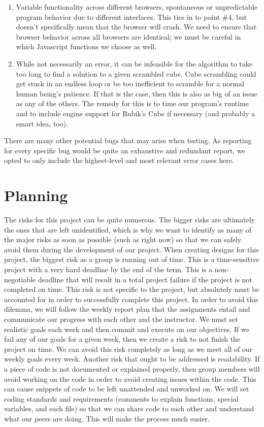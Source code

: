 \documentclass[12pt]{article}
\begin{document}
\begin{enumerate}
\item Variable functionality across different browsers, spontaneous or unpredictable program behavior due to different interfaces. This ties in to point \#4, but doesn’t specifically mean that the browser will crash. We need to ensure that browser behavior across all browsers are identical; we must be careful in which Javascript functions we choose as well.
\item While not necessarily an error, it can be infeasible for the algorithm to take too long to find a solution to a given scrambled cube. Cube scrambling could get stuck in an endless loop or be too inefficient to scramble for a normal human being’s patience. If that is the case, then this is also as big of an issue as any of the others. The remedy for this is to time our program’s runtime and to include engine support for Rubik’s Cube if necessary (and probably a smart idea, too).
\end{enumerate}
\par
There are many other potential bugs that may arise when testing. As reporting for every specific bug would be quite an exhaustive and redundant report, we opted to only include the highest-level and most relevant error cases here. \\

\section{Planning}

\par
The risks for this project can be quite numerous. The bigger risks are ultimately the ones that are left unidentified, which is why we want to identify as many of the major risks as soon as possible (such as right now) so that we can safely avoid them during the development of our project. When creating designs for this project, the biggest risk as a group is running out of time. This is a time-sensitive project with a very hard deadline by the end of the term. This is a non-negotiable deadline that will result in a total project failure if the project is not completed on time. This risk is not specific to the project, but absolutely must be accounted for in order to successfully complete this project. In order to avoid this dilemma, we will follow the weekly report plan that the assignments entail and communicate our progress with each other and the instructor. We must set realistic goals each week and then commit and execute on our objectives. If we fail any of our goals for a given week, then we create a risk to not finish the project on time. We can avoid this risk completely as long as we meet all of our weekly goals every week. Another risk that ought to be addressed is readability. If a piece of code is not documented or explained properly, then group members will avoid working on the code in order to avoid creating issues within the code. This can cause snippets of code to be left unattended and unworked on. We will set coding standards and requirements (comments to explain functions, special variables, and each file) so that we can share code to each other and understand what our peers are doing. This will make the process much easier. \\
\end{document}

